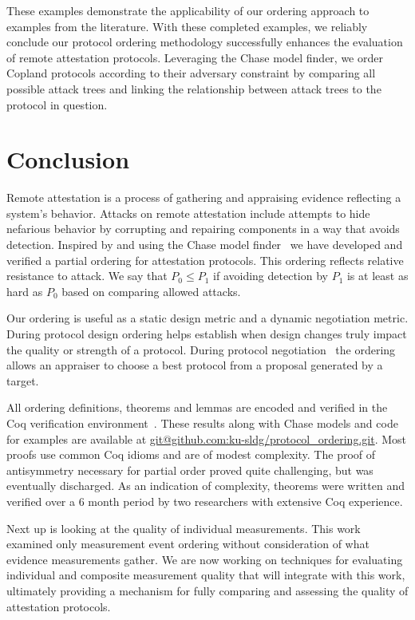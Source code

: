 \documentclass[runningheads]{llncs}
\theoremstyle{definition}
\begin{document}
These examples demonstrate the applicability of our ordering approach
to examples from the literature. With these completed examples, we
reliably conclude our protocol ordering methodology successfully
enhances the evaluation of remote attestation protocols. Leveraging
the Chase model finder, we order Copland protocols according to their
adversary constraint by comparing all possible attack trees and
linking the relationship between attack trees to the protocol in
question. 

\section{Conclusion}

Remote attestation is a process of gathering and appraising evidence
reflecting a system's behavior.  Attacks on remote attestation include
attempts to hide nefarious behavior by corrupting and repairing
components in a way that avoids detection.  Inspired by
\citet{Rowe:2021:OnOrdering} and using the Chase model
finder~\citep{Ramsdell:2020:Chase} we have developed and verified a
partial ordering for attestation protocols.  This ordering reflects
relative resistance to attack.  We say that $P_0\leq P_1$ if avoiding
detection by $P_1$ is at least as hard as $P_0$ based on comparing
allowed attacks.

Our ordering is useful as a static design metric and a dynamic
negotiation metric.  During protocol design ordering helps establish
when design changes truly impact the quality or strength of a
protocol.  During protocol negotiation~\citep{Fritz:2023:framework}
the ordering allows an appraiser to choose a best protocol from a
proposal generated by a target.

All ordering definitions, theorems and lemmas are encoded and verified
in the Coq verification environment~\citep{Bertot:2013aa}. These
results along with Chase models and code for examples are available at
\url{git@github.com:ku-sldg/protocol_ordering.git}.  Most proofs use
common Coq idioms and are of modest complexity.  The proof of
antisymmetry necessary for partial order proved quite challenging, but
was eventually discharged.  As an indication of complexity, theorems
were written and verified over a 6 month period by two researchers
with extensive Coq experience.

Next up is looking at the quality of individual measurements.  This
work examined only measurement event ordering without consideration of
what evidence measurements gather.  We are now working on techniques for
evaluating individual and composite measurement quality that will
integrate with this work, ultimately providing a mechanism for fully
comparing and assessing the quality of attestation protocols.
\end{document}

